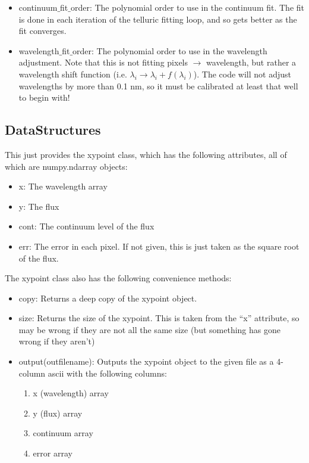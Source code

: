 \documentclass{article}
\begin{document}
\begin{itemize}
\begin{itemize}
      \item continuum$\_$fit$\_$order: The polynomial order to use in the continuum fit. The fit is done in each iteration of the telluric fitting loop, and so gets better as the fit converges.
      
      \item wavelength$\_$fit$\_$order: The polynomial order to use in the wavelength adjustment. Note that this is not fitting pixels $\rightarrow$ wavelength, but rather a wavelength shift function (i.e. $\lambda_i \rightarrow \lambda_i + f(\lambda_i)$). The code will not adjust wavelengths by more than 0.1 nm, so it must be calibrated at least that well to begin with!
    
    \end{itemize}
    
  
  
    
    
    
    
\subsection{DataStructures}
\label{subsec:datastructures}
This just provides the xypoint class, which has the following attributes, all of which are numpy.ndarray objects:
\begin{itemize}
  \item x: The wavelength array
  \item y: The flux
  \item cont: The continuum level of the flux
  \item err: The error in each pixel. If not given, this is just taken as the square root of the flux.
\end{itemize}

The xypoint class also has the following convenience methods:
\begin{itemize}

  \item copy: Returns a deep copy of the xypoint object.
  \item size: Returns the size of the xypoint. This is taken from the ``x'' attribute, so may be wrong if they are not all the same size (but something has gone wrong if they aren't)
  \item output(outfilename): Outputs the xypoint object to the given file as a 4-column ascii with the following columns:
  \begin{enumerate}
    \item x (wavelength) array
    \item y (flux) array
    \item continuum array
    \item error array
  \end{enumerate}
  

\end{itemize}
\end{itemize}
\end{document}
